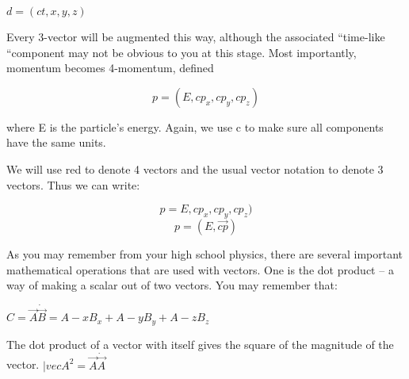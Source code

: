 	  {$d=(ct,x,y,z)$}

Every 3-vector will be augmented this way, although the associated “time-like “component may not be obvious to you at this stage.  Most importantly, momentum becomes 4-momentum, defined

	  \begin{equation}  p=(E,cp_x, cp_y, cp_z)  \end{equation}

where E is the particle’s energy. Again, we use c to make sure all components have the same units.
	 
We will use red to denote 4 vectors and the usual vector notation to denote 3 vectors.  Thus we can write:

	   \begin{equation} p=E,cp_x, cp_y, cp_z)  \end{equation}  	
	   \begin{equation} p=(E,\vec{cp})  \end{equation} 




	





As you may remember from your high school physics, there are several important mathematical operations that are used with vectors.  One is the dot product – a way of making a scalar out of two vectors.  You may remember that:

                                        { $C=\vec A \dot \vec B = A-xB_x +A-yB_y +A-zB_z $}

The dot product of a vector with itself gives the square of the magnitude of the vector.
      { $| vec{A^2} =\vec A \dot \vec A  $}
	  
